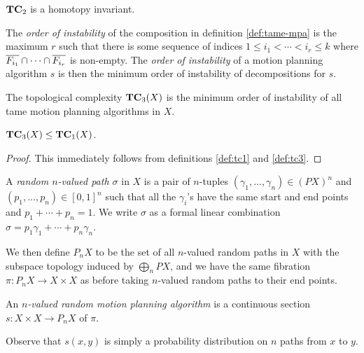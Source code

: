 \begin{theorem}
    $\operatorname{\mathbf{TC}}_2$ is a homotopy invariant.
\end{theorem}

\begin{definition}
    The \emph{order of instability} of the composition in definition \ref{def:tame-mpa} is the maximum $r$ such that there is some sequence of indices $1 \leq i_1 < \cdots < i_r \leq k$ where $\overline{F_{i_1}} \cap \cdots \cap \overline{F_{i_r}}$ is non-empty.
    The \emph{order of instability} of a motion planning algorithm $s$ is then the minimum order of instability of decompositions for $s$.
\end{definition}

\begin{definition}\label{def:tc3}
    The topological complexity $\operatorname{\mathbf{TC}}_3(X)$ is the minimum order of instability of all tame motion planning algorithms in $X$.
\end{definition}

\begin{remark}\label{rem:tc3-leq-tc1}
    $\operatorname{\mathbf{TC}}_3(X) \leq \operatorname{\mathbf{TC}}_1(X)$.
    \begin{proof}
        This immediately follows from definitions \ref{def:tc1} and \ref{def:tc3}.
    \end{proof}
\end{remark}

\begin{definition}
    A \emph{random $n$-valued path $\sigma$} in $X$ is a pair of $n$-tuples $(\gamma_1,...,\gamma_n) \in (PX)^n$ and $(p_1,...,p_n) \in [0,1]^n$ such that all the $\gamma_i$'s have the same start and end points and $p_1 + \cdots + p_n = 1$.
    We write $\sigma$ as a formal linear combination $\sigma = p_1 \gamma_1 + \cdots + p_n \gamma_n$.
    
    We then define $P_n X$ to be the set of all $n$-valued random paths in $X$ with the subspace topology induced by $\bigoplus_n PX$, and we have the same fibration $\pi : P_n X \to X \times X$ as before taking $n$-valued random paths to their end points.
\end{definition}

\begin{definition}
    An \emph{$n$-valued random motion planning algorithm} is a continuous section $s : X \times X \to P_n X$ of $\pi$.
    
    Observe that $s(x,y)$ is simply a probability distribution on $n$ paths from $x$ to $y$.
\end{definition}

